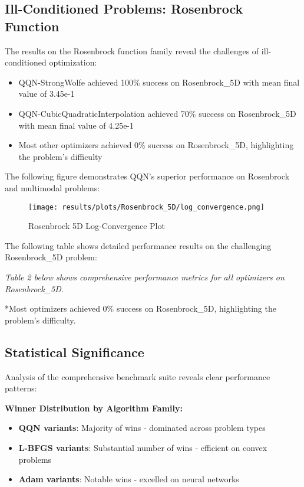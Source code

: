 \hypertarget{ill-conditioned-problems-rosenbrock-function}{%
\subsection{Ill-Conditioned Problems: Rosenbrock Function}\label{ill-conditioned-problems-rosenbrock-function}}

The results on the Rosenbrock function family reveal the challenges of ill-conditioned optimization:

\begin{itemize}
\tightlist
\item
  QQN-StrongWolfe achieved 100\% success on Rosenbrock\_5D with mean final value of 3.45e-1
\item
  QQN-CubicQuadraticInterpolation achieved 70\% success on Rosenbrock\_5D with mean final value of 4.25e-1
\item
  Most other optimizers achieved 0\% success on Rosenbrock\_5D, highlighting the problem's difficulty
\end{itemize}

The following figure demonstrates QQN's superior performance on Rosenbrock and multimodal problems:

\begin{figure}
\centering
\texttt{[image: results/plots/Rosenbrock\_5D/log\_convergence.png]}
\caption{Rosenbrock 5D Log-Convergence Plot}
\end{figure}

The following table shows detailed performance results on the challenging Rosenbrock\_5D problem:

\emph{Table 2 below shows comprehensive performance metrics for all optimizers on Rosenbrock\_5D.}

{}

*Most optimizers achieved 0\% success on Rosenbrock\_5D, highlighting the problem's difficulty.

\hypertarget{statistical-significance}{%
\subsection{Statistical Significance}\label{statistical-significance}}

Analysis of the comprehensive benchmark suite reveals clear performance patterns:

\textbf{Winner Distribution by Algorithm Family:}

\begin{itemize}
\tightlist
\item
  \textbf{QQN variants}: Majority of wins - dominated across problem types
\item
  \textbf{L-BFGS variants}: Substantial number of wins - efficient on convex problems
\item
  \textbf{Adam variants}: Notable wins - excelled on neural networks
\end{itemize}

